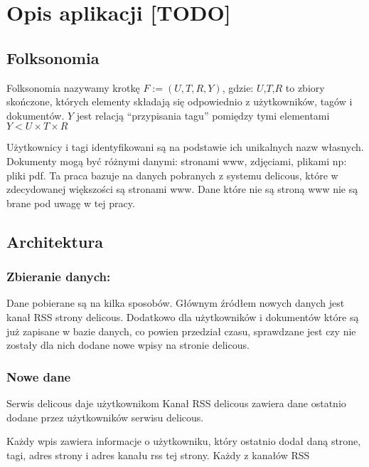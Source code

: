 \chapter{Opis aplikacji [TODO]}

\section{Folksonomia}

Folksonomia nazywamy krotkę $F := (U,T,R,Y)$, gdzie:
$U$,$T$,$R$ to zbiory skończone, których elementy składają się odpowiednio z użytkowników, tagów i dokumentów. $Y$ jest relacją “przypisania tagu” pomiędzy tymi elementami $Y < U \times T \times R$

Użytkownicy i tagi identyfikowani są na podstawie ich unikalnych nazw własnych. Dokumenty mogą być różnymi danymi: stronami www, zdjęciami, plikami np: pliki pdf. Ta praca bazuje na danych pobranych z systemu delicous, które w zdecydowanej większości są stronami www. Dane które nie są stroną www nie są brane pod uwagę w tej pracy. 

\section{Architektura}

\subsection{Zbieranie danych:}

Dane pobierane są na kilka sposobów. Głównym źródłem nowych danych jest kanał RSS strony delicous. Dodatkowo dla użytkowników i dokumentów które są już zapisane w bazie danych, co powien przedział czasu, sprawdzane jest czy nie zostały dla nich dodane nowe wpisy na stronie delicous.

\subsection*{Nowe dane}

Serwis delicous daje użytkownikom 
Kanał RSS delicous zawiera dane ostatnio dodane przez użytkowników serwisu delicous. 


Każdy wpis zawiera informacje o użytkowniku, który ostatnio dodał daną strone, tagi, adres strony i adres kanału rss tej strony. Każdy z kanałów RSS


